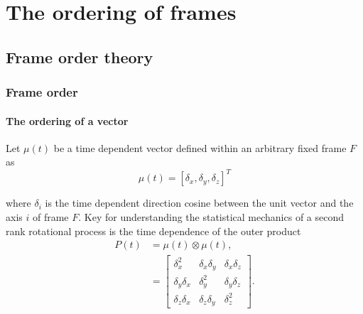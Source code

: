 
\chapter[Frame order]{The ordering of frames} \label{ch: frame order}



\section{Frame order theory}





\subsection{Frame order}





\subsubsection{The ordering of a vector}

Let $\mu(t)$ be a time dependent vector defined within an arbitrary fixed frame $F$ as
\begin{equation}
    \mu(t) = \left[ \delta_x, \delta_y, \delta_z \right]^T
\end{equation}

where $\delta_i$ is the time dependent direction cosine between the unit vector and the axis $i$ of frame $F$.
Key for understanding the statistical mechanics of a second rank rotational process is the time dependence of the outer product
\begin{align}
    P(t) &= \mu(t) \otimes \mu(t) , \label{eq: time dependent vector outer product} \\
            &= \begin{bmatrix}
                \delta_x^2       & \delta_x\delta_y & \delta_x\delta_z \\
                \delta_y\delta_x & \delta_y^2       & \delta_y\delta_z \\
                \delta_z\delta_x & \delta_z\delta_y & \delta_z^2
               \end{bmatrix} .
\end{align}

